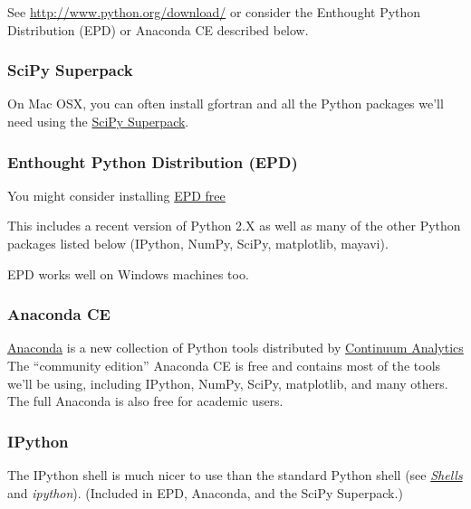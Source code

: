 \documentclass[letterpaper,10pt,english]{sphinxmanual}
\begin{document}
See \href{http://www.python.org/download/}{http://www.python.org/download/} or consider the Enthought Python
Distribution (EPD) or Anaconda CE described below.


\subsubsection{SciPy Superpack}
\label{software_installation:scipy-superpack}\label{software_installation:installing-superpack}
On Mac OSX, you can often install gfortran and all the Python packages we'll
need using the \href{http://fonnesbeck.github.com/ScipySuperpack/}{SciPy Superpack}.


\subsubsection{Enthought Python Distribution (EPD)}
\label{software_installation:enthought-python-distribution-epd}\label{software_installation:installing-epd}
You might consider installing
\href{http://www.enthought.com/products/epd\_free.php}{EPD free}

This includes a recent version of Python 2.X as well as many of the other
Python packages listed below (IPython, NumPy, SciPy, matplotlib, mayavi).

EPD works well on Windows machines too.


\subsubsection{Anaconda CE}
\label{software_installation:installing-anaconda}\label{software_installation:anaconda-ce}
\href{https://store.continuum.io/cshop/anaconda}{Anaconda}
is a new collection of Python tools distributed by
\href{http://www.continuum.io/index.html}{Continuum Analytics}
The ``community edition'' Anaconda CE is free and contains most of the tools
we'll be using, including IPython, NumPy, SciPy, matplotlib,
and many others.  The full Anaconda is also free for academic users.


\subsubsection{IPython}
\label{software_installation:ipython}\label{software_installation:installing-ipython}
The IPython shell is much nicer to use than the standard Python shell (see
{\hyperref[shells:shells]{\emph{Shells}}} and \emph{ipython}).
(Included in EPD, Anaconda, and the SciPy Superpack.)
\end{document}
